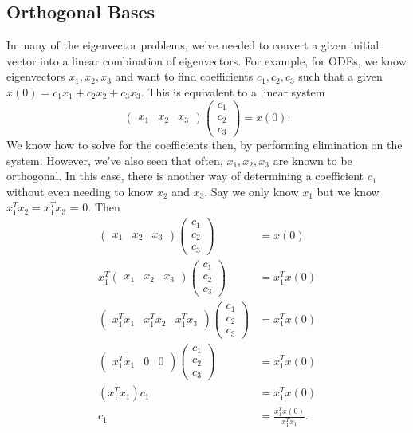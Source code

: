 \documentclass[11pt]{article}
\theoremstyle{plain} %
\theoremstyle{definition}
\theoremstyle{remark}
\begin{document}
\subsection{Orthogonal Bases}
In many of the eigenvector problems, we've needed to convert a given initial vector into a linear combination of eigenvectors. For example, for ODEs, we know eigenvectors $x_1, x_2, x_3$ and want to find coefficients $c_1, c_2, c_3$ such that a given $x(0) = c_1 x_1 + c_2 x_2 + c_3 x_3$. This is equivalent to a linear system $$\begin{pmatrix} x_1 & x_2 & x_3\end{pmatrix}\begin{pmatrix}c_1\\c_2\\c_3\end{pmatrix} = x(0).$$
We know how to solve for the coefficients then, by performing elimination on the system. However, we've also seen that often, $x_1, x_2, x_3$ are known to be orthogonal. In this case, there is another way of determining a coefficient $c_1$ without even needing to know $x_2$ and $x_3$. Say we only know $x_1$ but we know $x_1^Tx_2 = x_1^Tx_3$ = 0. Then
\begin{align*}
\begin{pmatrix} x_1 & x_2 & x_3\end{pmatrix}\begin{pmatrix}c_1\\c_2\\c_3\end{pmatrix} &= x(0)\\
x_1^T\begin{pmatrix} x_1 & x_2 & x_3\end{pmatrix}\begin{pmatrix}c_1\\c_2\\c_3\end{pmatrix} &= x_1^Tx(0)\\
\begin{pmatrix}x_1^T x_1 & x_1^T x_2 & x_1^T x_3\end{pmatrix}\begin{pmatrix}c_1\\c_2\\c_3\end{pmatrix} &= x_1^T x(0)\\
\begin{pmatrix}x_1^T x_1 & 0 & 0\end{pmatrix}\begin{pmatrix}c_1\\c_2\\c_3\end{pmatrix} &= x_1^T x(0)\\
(x_1^T x_1)c_1 &= x_1^T x(0)\\
c_1 &= \frac{x_1^Tx(0)}{x_1^Tx_1}.
\end{align*}
\end{document}
